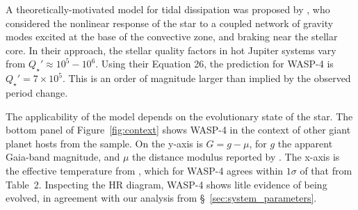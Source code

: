 \documentclass[12pt,twocolumn,tighten]{aastex62}
\begin{document}

A theoretically-motivated model for tidal dissipation was proposed by
\citet{essick_orbital_2016}, who considered the nonlinear response of
the star to a coupled network of gravity modes excited at the base of
the convective zone, and braking near the stellar core.  In their
approach, the stellar quality factors in hot Jupiter systems vary from
$Q_\star' \approx 10^5 - 10^6$.  Using their Equation 26, the
prediction for WASP-4 is $Q_\star' = 7\times10^5$.  This is an order
of magnitude larger than implied by the observed period change.

The applicability of the \citet{essick_orbital_2016} model depends on
the evolutionary state of the star.  The bottom panel of
Figure~\ref{fig:context} shows WASP-4 in the context of other giant
planet hosts from the \citet{bonomo_gaps_2017} sample.  On the y-axis
is $G=g-\mu$, for $g$ the apparent Gaia-band magnitude, and $\mu$ the
distance modulus reported by \citet{gaia_collaboration_gaia_2018}.
The x-axis is the effective temperature from \citet{bonomo_gaps_2017},
which for WASP-4 agrees within $1\sigma$ of that from Table~2.
Inspecting the HR diagram, WASP-4 shows litle evidence of being
evolved, in agreement with our analysis from
\S~\ref{sec:system_parameters}.
\end{document}
